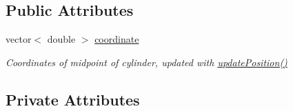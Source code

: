\subsection*{Public Attributes}
\begin{DoxyCompactItemize}
\item 
vector$<$ double $>$ \hyperlink{classCylinder_a8c7a6cfe1aecf1ee0eff3aaf9c11338f}{coordinate}
\begin{DoxyCompactList}\small\item\em Coordinates of midpoint of cylinder, updated with \hyperlink{classCylinder_aff701d6f4400ab216431d627c54a0b4e}{update\+Position()} \end{DoxyCompactList}\end{DoxyCompactItemize}
\subsection*{Private Attributes}
